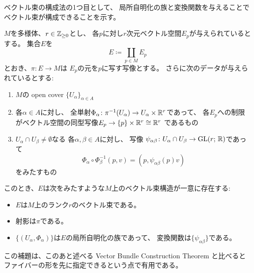 \documentclass[report]{jlreq}
\begin{document}
ベクトル束の構成法の1つ目として、
局所自明化の族と変換関数を与えることで
ベクトル束が構成できることを示す。

\begin{lemma}
    $M$を多様体、$r \in \mathbb{Z}_{\ge 0}$とし、
    各$p$に対し$r$次元ベクトル空間$E_p$が与えられているとする。
    集合$E$を
    \begin{equation}
        E \coloneqq \coprod_{p \in M} E_p
    \end{equation}
    とおき、$\pi \colon E \to M$は
    $E_p$の元を$p$に写す写像とする。
    さらに次のデータが与えられているとする:
    \begin{enumerate}
        \item $M$の open cover $\{U_\alpha\}_{\alpha \in A}$
        \item 各$\alpha \in A$に対し、
            全単射$\Phi_\alpha \colon \pi^{-1}(U_\alpha) \to U_\alpha \times \mathbb{R}^r$であって、
            各$E_p$への制限がベクトル空間の同型写像$E_p \to \{ p \} \times \mathbb{R}^r \cong \mathbb{R}^r$
            であるもの
        \item $U_\alpha \cap U_\beta \neq \emptyset$なる
            各$\alpha, \beta \in A$に対し、
            {\smooth}写像
            $\psi_{\alpha \beta} \colon U_\alpha \cap U_\beta \to \operatorname{\mathrm{GL}}(r;\, \mathbb{R})$であって
            \begin{equation}
                \Phi_\alpha \circ \Phi_\beta^{-1} (p, v)
                    = (p, \psi_{\alpha \beta}(p) v)
            \end{equation}
            をみたすもの
    \end{enumerate}
    このとき、$E$は次をみたすような$M$上のベクトル束構造が一意に存在する:
    \begin{itemize}
        \item $E$は$M$上のランク$r$のベクトル束である。
        \item 射影は$\pi$である。
        \item $\{(U_\alpha, \Phi_\alpha)\}$は$E$の局所自明化の族であって、
            変換関数は$\{ \psi_{\alpha \beta} \}$である。
    \end{itemize}
\end{lemma}

\begin{remark}
    この補題は、このあと述べる Vector Bundle Construction Theorem と比べると
    ファイバーの形を先に指定できるという点で有用である。
\end{remark}
\end{document}
